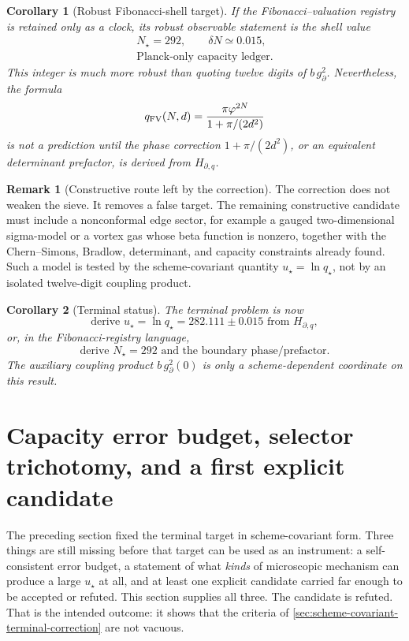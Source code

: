 \documentclass[aps,prd,reprint,nofootinbib,superscriptaddress,floatfix]{revtex4-2}
\numberwithin{equation}{section}
\theoremstyle{definition}
\newtheorem{remark}{Remark}[section]
\theoremstyle{plain}
\newtheorem{corollary}{Corollary}[section]
\begin{document}
\begin{corollary}[Robust Fibonacci-shell target]\label{cor:shell-target}
If the Fibonacci--valuation registry is retained only as a clock, its robust
observable statement is the shell value
\begin{equation}
\boxed{
\begin{gathered}
        N_\star=292,\qquad \delta N\simeq0.015,\\
        \text{Planck-only capacity ledger.}
\end{gathered}}
\end{equation}
This integer is much more robust than quoting twelve digits of
\(b\,g_\partial^2\).  Nevertheless, the formula
\[
q_{\rm FV}(N,d)
=
\frac{\pi\varphi^{2N}}{1+\pi/(2d^2)}
\]
is not a prediction until the phase correction \(1+\pi/(2d^2)\), or an
equivalent determinant prefactor, is derived from \(H_{\partial,q}\).
\end{corollary}

\begin{remark}[Constructive route left by the correction]
The correction does not weaken the sieve.  It removes a false target.  The
remaining constructive candidate must include a nonconformal edge sector, for
example a gauged two-dimensional sigma-model or a vortex gas whose beta
function is nonzero, together with the Chern--Simons, Bradlow, determinant, and
capacity constraints already found.  Such a model is tested by the
scheme-covariant quantity \(u_\star=\ln q_\star\), not by an isolated
twelve-digit coupling product.
\end{remark}

\begin{corollary}[Terminal status]\label{cor:terminal-status}
The terminal problem is now
\[
\boxed{
\text{derive }u_\star=\ln q_\star=282.111\pm0.015
\text{ from }H_{\partial,q},
}
\]
or, in the Fibonacci-registry language,
\[
\boxed{
\text{derive }N_\star=292
\text{ and the boundary phase/prefactor.}
}
\]
The auxiliary coupling product \(b\,g_\partial^2(0)\) is only a
scheme-dependent coordinate on this result.
\end{corollary}




\section{Capacity error budget, selector trichotomy, and a first explicit candidate}
\label{sec:universality-classes}

The preceding section fixed the terminal target in scheme-covariant form.
Three things are still missing before that target can be used as an
instrument: a self-consistent error budget, a statement of what
\emph{kinds} of microscopic mechanism can produce a large \(u_\star\) at
all, and at least one explicit candidate carried far enough to be accepted
or refuted.  This section supplies all three.  The candidate is refuted.
That is the intended outcome: it shows that the criteria of
\cref{sec:scheme-covariant-terminal-correction} are not vacuous.
\end{document}
